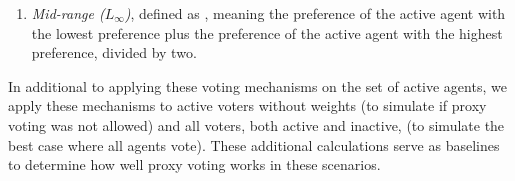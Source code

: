 \begin{enumerate}
{        %
        This is a typical weighted average.
    }
    \item {
        \textit{Mid-range ($L_\infty$)}, defined as
        $$, meaning the preference
        of the active agent with the lowest preference plus the preference of the
        active agent with the highest preference, divided by two.
    }
\end{enumerate}
In additional to applying these voting mechanisms on the set of active agents, we
apply these mechanisms to active voters without weights (to simulate if proxy voting was
not allowed) and all voters, both active and inactive, (to simulate the best case
where all agents vote).
These additional calculations serve as baselines to determine how well proxy voting
works in these scenarios.

